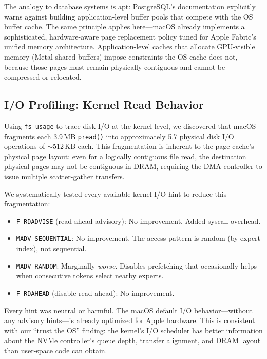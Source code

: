 \documentclass[11pt,twocolumn]{article}
\begin{document}
The analogy to database systems is apt: PostgreSQL's documentation explicitly warns against building application-level buffer pools that compete with the OS buffer cache.
The same principle applies here---macOS already implements a sophisticated, hardware-aware page replacement policy tuned for Apple Fabric's unified memory architecture.
Application-level caches that allocate GPU-visible memory (Metal shared buffers) impose constraints the OS cache does not, because those pages must remain physically contiguous and cannot be compressed or relocated.

\subsection{I/O Profiling: Kernel Read Behavior}
\label{sec:io_profiling}

Using \texttt{fs\_usage} to trace disk I/O at the kernel level, we discovered that macOS fragments each 3.9\,MB \texttt{pread()} into approximately 5.7 physical disk I/O operations of $\sim$512\,KB each.
This fragmentation is inherent to the page cache's physical page layout: even for a logically contiguous file read, the destination physical pages may not be contiguous in DRAM, requiring the DMA controller to issue multiple scatter-gather transfers.

We systematically tested every available kernel I/O hint to reduce this fragmentation:

\begin{itemize}[leftmargin=*,itemsep=2pt]
    \item \texttt{F\_RDADVISE} (read-ahead advisory): No improvement. Added syscall overhead.
    \item \texttt{MADV\_SEQUENTIAL}: No improvement. The access pattern is random (by expert index), not sequential.
    \item \texttt{MADV\_RANDOM}: Marginally \emph{worse}. Disables prefetching that occasionally helps when consecutive tokens select nearby experts.
    \item \texttt{F\_RDAHEAD} (disable read-ahead): No improvement.
\end{itemize}

Every hint was neutral or harmful.
The macOS default I/O behavior---without any advisory hints---is already optimized for Apple hardware.
This is consistent with our ``trust the OS'' finding: the kernel's I/O scheduler has better information about the NVMe controller's queue depth, transfer alignment, and DRAM layout than user-space code can obtain.
\end{document}
